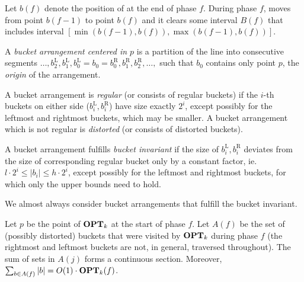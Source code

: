 Let $b(f)$ denote the position of \fazowy{} at the end of phase $f$. During
phase $f$, \fazowy{} moves from point $b(f-1)$ to point $b(f)$ and it clears
some interval $B(f)$ that includes interval $[\min(b(f-1), b(f)), \max(b(f-1),
b(f))]$.

\begin{definition}
A \emph{bucket arrangement centered in $p$} is a partition of the line into
consecutive segments $\ldots, b_2^\text{L}, b_1^\text{L}, b_0^\text{L} = b_0 =
b_0^\text{R}, b_1^\text{R}, b_2^\text{R}, \ldots,$ such that $b_0$ contains only
point $p$, the \emph{origin} of the arrangement.

A bucket arrangement is \emph{regular} (or consists of regular buckets) if the
$i$-th buckets on either side ($b_i^\text{L},b_i^\text{R}$) have size exactly
$2^i$, except possibly for the leftmost and rightmost buckets, which may be
smaller. A bucket arrangement which is not regular is \emph{distorted} (or
consists of distorted buckets).

A bucket arrangement fulfills \emph{bucket invariant} if the size of
$b_i^\text{L},b_i^\text{R}$ deviates from the size of corresponding regular
bucket only by a constant factor, ie.\ $l\cdot2^i\leq|b_i|\leq
h\cdot2^i$, except possibly for the leftmost and
rightmost buckets, for which only the upper bounds need to hold.
%
%
\end{definition}

We almost always consider bucket arrangements that fulfill the bucket invariant.

\begin{observe}
Let $p$ be the point of $\operatorname{\mathbf{OPT}}_k$ at the start of phase $f$. Let $A(f)$ be the
set of (possibly distorted) buckets that were visited by $\operatorname{\mathbf{OPT}}_k$ during phase
$f$ (the rightmost and leftmost buckets are not, in general, traversed
throughout). The sum of sets in $A(j)$ forms a continuous section. Moreover,
$\sum_{b \in A(f)} |b| = O(1) \cdot \operatorname{\mathbf{OPT}}_k(f)$.
\end{observe}

